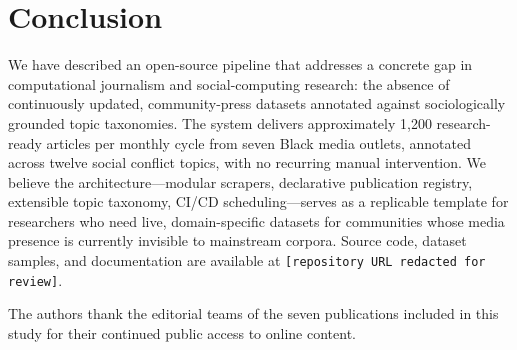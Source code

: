 \documentclass[sigconf,anonymous,review]{acmart}
\begin{document}
\section{Conclusion}

We have described an open-source pipeline that addresses a concrete gap in
computational journalism and social-computing research: the absence of
continuously updated, community-press datasets annotated against sociologically
grounded topic taxonomies.
The system delivers approximately 1,200 research-ready articles per monthly
cycle from seven Black media outlets, annotated across twelve social conflict
topics, with no recurring manual intervention.
We believe the architecture—modular scrapers, declarative publication registry,
extensible topic taxonomy, CI/CD scheduling—serves as a replicable template for
researchers who need live, domain-specific datasets for communities whose media
presence is currently invisible to mainstream corpora.
Source code, dataset samples, and documentation are available at
\texttt{[repository URL redacted for review]}.

\begin{acks}
The authors thank the editorial teams of the seven publications included in
this study for their continued public access to online content.
\end{acks}
\end{document}
